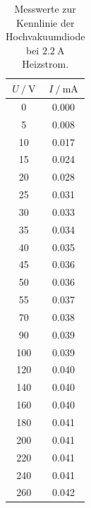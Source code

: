 \begin{table}
  \centering
  \caption{Messwerte zur Kennlinie der Hochvakuumdiode bei $\SI{2.2}{\ampere}$ Heizstrom.}
  \label{tab:a22tab}
  \begin{tabular}{S[table-format=3.0] S[table-format=1.3]}
    \toprule
    {$U \:/\: \si{\volt}$} & {$I \:/\: \si{\milli\ampere}$}\\
    	  & 0.000 \\
    5	  & 0.008 \\
    10	& 0.017 \\
    15	& 0.024 \\
    20	& 0.028 \\
    25	& 0.031 \\
    30	& 0.033 \\
    35	& 0.034 \\
    40	& 0.035 \\
    45	& 0.036 \\
    50	& 0.036 \\
    55	& 0.037 \\
    70	& 0.038 \\
    90	& 0.039 \\
    100	& 0.039 \\
    120	& 0.040 \\
    140	& 0.040 \\
    160	& 0.040 \\
    180	& 0.041 \\
    200	& 0.041 \\
    220	& 0.041 \\
    240	& 0.041 \\
    260	& 0.042 \\
   \end{tabular}
\end{table}

